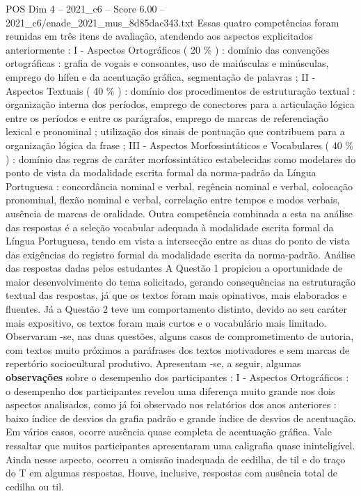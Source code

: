\begin{textsample}{POS Dim 4 – 2021\_c6 – Score 6.00 – 2021\_c6/enade\_2021\_mus\_8d85dac343.txt}
Essas quatro competências foram reunidas em três itens de avaliação, atendendo aos aspectos explicitados anteriormente : I - Aspectos Ortográficos ( 20 \% ) : domínio das convenções ortográficas : grafia de vogais e consoantes, uso de maiúsculas e minúsculas, emprego do hífen e da acentuação gráfica, segmentação de palavras ; II - Aspectos Textuais ( 40 \% ) : domínio dos procedimentos de estruturação textual : organização interna dos períodos, emprego de conectores para a articulação lógica entre os períodos e entre os parágrafos, emprego de marcas de referenciação lexical e pronominal ; utilização dos sinais de pontuação que contribuem para a organização lógica da frase ; III - Aspectos Morfossintáticos e Vocabulares ( 40 \% ) : domínio das regras de caráter morfossintático estabelecidas como modelares do ponto de vista da modalidade escrita formal da norma-padrão da Língua Portuguesa : concordância nominal e verbal, regência nominal e verbal, colocação pronominal, flexão nominal e verbal, correlação entre tempos e modos verbais, ausência de marcas de oralidade.
Outra competência combinada a esta na análise das respostas é a seleção vocabular adequada à modalidade escrita formal da Língua Portuguesa, tendo em vista a intersecção entre as duas do ponto de vista das exigências do registro formal da modalidade escrita da norma-padrão.
Análise das respostas dadas pelos estudantes A Questão 1 propiciou a oportunidade de maior desenvolvimento do tema solicitado, gerando consequências na estruturação textual das respostas, já que os textos foram mais opinativos, mais elaborados e fluentes.
Já a Questão 2 teve um comportamento distinto, devido ao seu caráter mais expositivo, os textos foram mais curtos e o vocabulário mais limitado.
Observaram -se, nas duas questões, alguns casos de comprometimento de autoria, com textos muito próximos a paráfrases dos textos motivadores e sem marcas de repertório sociocultural produtivo.
Apresentam -se, a seguir, algumas \textbf{observações} sobre o desempenho dos participantes : I - Aspectos Ortográficos : o desempenho dos participantes revelou uma diferença muito grande nos dois aspectos analisados, como já foi observado nos relatórios dos anos anteriores : baixo índice de desvios da grafia padrão e grande índice de desvios de acentuação.
Em vários casos, ocorre ausência quase completa de acentuação gráfica.
Vale ressaltar que muitos participantes apresentaram uma caligrafia quase ininteligível.
Ainda nesse aspecto, ocorreu a omissão inadequada de cedilha, de til e do traço do T em algumas respostas.
Houve, inclusive, respostas com ausência total de cedilha ou til.

\end{textsample}
